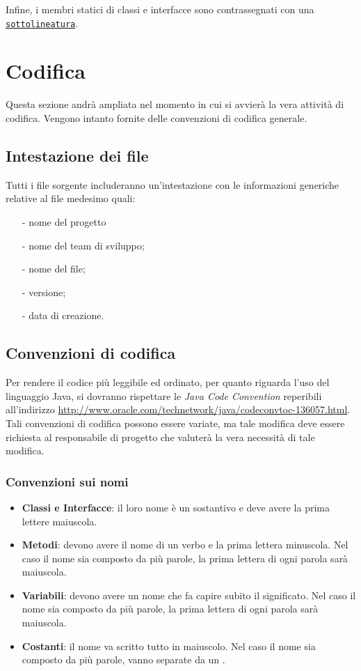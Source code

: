 {Infine, i membri statici di classi e interfacce sono contrassegnati con una \underline{\texttt{sottolineatura}}.

\newpage
\section{Codifica}
Questa sezione andrà ampliata nel momento in cui si avvierà la vera attività di codifica. Vengono intanto fornite delle convenzioni di codifica generale.

\subsection{Intestazione dei file}
Tutti i file sorgente includeranno un'intestazione con le informazioni generiche relative al file medesimo quali:
\begin{itemize}
\item[-] nome del progetto
\item[-] nome del team di sviluppo;
\item[-] nome del file;
\item[-] versione;
\item[-] data di creazione.
\end{itemize}
\subsection{Convenzioni di codifica}
Per rendere il codice più leggibile ed ordinato, per quanto riguarda l'uso del linguaggio Java, si dovranno rispettare le \textit{Java Code Convention} reperibili all'indirizzo \url{http://www.oracle.com/technetwork/java/codeconvtoc-136057.html}. 
Tali convenzioni di codifica possono essere variate, ma tale modifica deve essere richiesta al responsabile di progetto che valuterà la vera necessità di tale modifica.


\subsubsection{Convenzioni sui nomi}
\begin{itemize}
\item \textbf{Classi e Interfacce}: il loro nome è un sostantivo e deve avere la prima lettere maiuscola.
\item \textbf{Metodi}: devono avere il nome di un verbo e la prima lettera minuscola. Nel caso il nome sia composto da più parole, la prima lettera di ogni parola sarà maiuscola.
\item \textbf{Variabili}: devono avere un nome che fa capire subito il significato. Nel caso il nome sia composto da più parole, la prima lettera di ogni parola sarà maiuscola.
\item \textbf{Costanti}: il nome va scritto tutto in maiuscolo. Nel caso il nome sia composto da più parole, vanno separate da un .


\end{itemize}}
